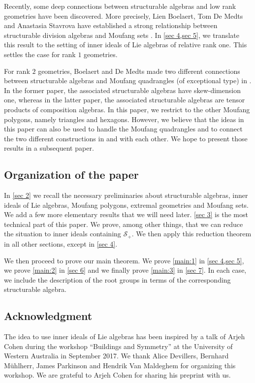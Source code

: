 \documentclass[oneside,a4paper]{amsart} %
\theoremstyle{definition}
\renewcommand{\SS}{\mathcal{S}}
\numberwithin{equation}{section}
\begin{document}
Recently, some deep connections between structurable algebras and low rank geometries have been discovered.
More precisely, Lien Boelaert, Tom De Medts and Anastasia Stavrova have established a strong relationship between structurable division algebras and Moufang sets \cite{Boelaert2019}.
In \cref{sec 4,sec 5}, we translate this result to the setting of inner ideals of Lie algebras of relative rank one.
This settles the case for rank $1$ geometries. 

For rank $2$ geometries, Boelaert and De Medts made two different connections between structurable algebras and Moufang quadrangles (of exceptional type) in \cite{Boelaert2013,Boelaert2015}.
In the former paper, the associated structurable algebras have skew-dimension one, whereas in the latter paper, the associated structurable algebras are tensor products of composition algebras.
In this paper, we restrict to the other Moufang polygons, namely triangles and hexagons.
However, we believe that the ideas in this paper can also be used to handle the Moufang quadrangles and to connect the two different constructions in \cite{Boelaert2013} and \cite{Boelaert2015} with each other.
We hope to present those results in a subsequent paper.


\subsection{Organization of the paper}

In \cref{sec 2} we recall the necessary preliminaries about structurable algebras, inner ideals of Lie algebras, Moufang polygons, extremal geometries and Moufang sets. We add a few more elementary results that we will need later.
\cref{sec 3} is the most technical part of this paper. We prove, among other things, that we can reduce the situation to inner ideals containing $\SS_+$. 
We then apply this reduction theorem in all other sections, except in \cref{sec 4}.

We then proceed to prove our main theorem.
We prove \cref{main:1} in \cref{sec 4,sec 5}, we prove \cref{main:2} in \cref{sec 6} and we finally prove \cref{main:3} in \cref{sec 7}.
In each case, we include the description of the root groups in terms of the corresponding structurable algebra.

\subsection{Acknowledgment}

The idea to use inner ideals of Lie algebras has been inspired by a talk of Arjeh Cohen during the workshop ``Buildings and Symmetry'' at the University of Western Australia in September 2017. We thank Alice Devillers, Bernhard M\"uhlherr, James Parkinson and Hendrik Van Maldeghem for organizing this workshop. We are grateful to Arjeh Cohen for sharing his preprint \cite{Cohen2020} with us.
\end{document}

